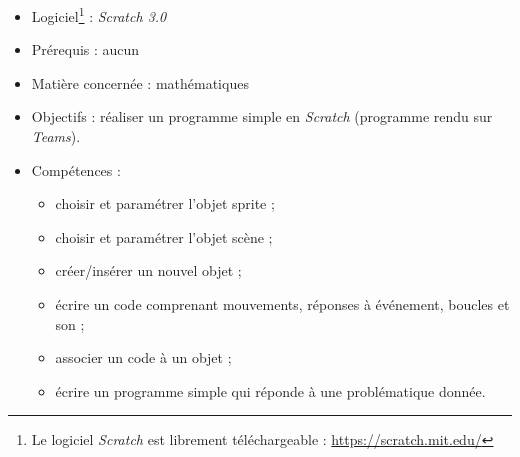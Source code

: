 {\footnotesize
\begin{itemize}
\item Logiciel\footnote{Le logiciel \emph{Scratch} est librement téléchargeable : \url{https://scratch.mit.edu/}} : \emph{Scratch 3.0}
\item Prérequis : aucun
\item Matière concernée : mathématiques
\item Objectifs : réaliser un programme simple en \emph{Scratch} (programme rendu sur \emph{Teams}).
\item Compétences : 
        \begin{itemize}
        \item choisir et paramétrer l'objet sprite ;
        \item choisir et paramétrer l'objet scène ;
        \item créer/insérer un nouvel objet ; 
        \item écrire un code comprenant mouvements, réponses à événement, boucles et son ;
        \item associer un code à un objet ;
        \item écrire un programme simple qui réponde à une problématique donnée.
        \end{itemize}
\end{itemize}
}







\newpage



